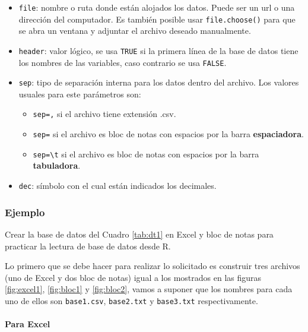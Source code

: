 \documentclass[10pt,]{krantz}
\providecommand{\tightlist}{%
  \setlength{\itemsep}{0pt}\setlength{\parskip}{0pt}}
\let\oldparagraph\paragraph
\renewcommand{\paragraph}[1]{\oldparagraph{#1}\mbox{}}
\begin{document}
\begin{itemize}
\tightlist
\item
  \texttt{file}: nombre o ruta donde están alojados los datos. Puede ser
  un url o una dirección del computador. Es también posible usar
  \texttt{file.choose()} para que se abra un ventana y adjuntar el
  archivo deseado manualmente.
\item
  \texttt{header}: valor lógico, se usa \texttt{TRUE} si la primera
  línea de la base de datos tiene los nombres de las variables, caso
  contrario se usa \texttt{FALSE}.
\item
  \texttt{sep}: tipo de separación interna para los datos dentro del
  archivo. Los valores usuales para este parámetros son:

  \begin{itemize}
  \tightlist
  \item
    \texttt{sep=\textquotesingle{},\textquotesingle{}} si el archivo
    tiene extensión .csv.
  \item
    \texttt{sep=\textquotesingle{}\textquotesingle{}} si el archivo es
    bloc de notas con espacios por la barra \textbf{espaciadora}.
  \item
    \texttt{sep=\textquotesingle{}\textbackslash{}t\textquotesingle{}}
    si el archivo es bloc de notas con espacios por la barra
    \textbf{tabuladora}.
  \end{itemize}
\item
  \texttt{dec}: símbolo con el cual están indicados los decimales.
\end{itemize}

\subsubsection*{Ejemplo}\label{ejemplo-9}

Crear la base de datos del Cuadro \ref{tab:dt1} en Excel y bloc de notas
para practicar la lectura de base de datos desde R.

Lo primero que se debe hacer para realizar lo solicitado es construir
tres archivos (uno de Excel y dos bloc de notas) igual a los mostrados
en las figuras \ref{fig:excel1}, \ref{fig:bloc1} y \ref{fig:bloc2},
vamos a suponer que los nombres para cada uno de ellos son
\texttt{base1.csv}, \texttt{base2.txt} y \texttt{base3.txt}
respectivamente.

\paragraph{Para Excel}\label{para-excel}
\end{document}
